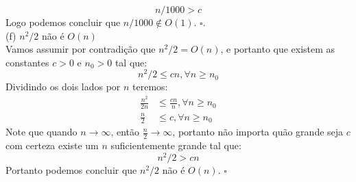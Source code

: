 \[ n/1000 > c\]
Logo podemos concluir que $n/1000 \not \in O(1)$. $\square$.
\\[6pt]
(f) $n^2/2$ não é $O(n)$
\\[6pt]
Vamos assumir por contradição que $n^2/2 = O(n)$, e portanto que existem as constantes $c > 0$ e $n_0 > 0$ tal que:
\[ n^2/2 \leq  cn, \forall n \geq n_0 \]
Dividindo os dois lados por $n$ teremos:
\begin{align*}
  \frac{n^2}{2n} &\leq \frac{cn}{n}, \forall n \geq n_0 \\
  \frac{n}{2} &\leq c, \forall n \geq n_0
\end{align*}
Note que quando $n \rightarrow \infty$, então $\frac{n}{2} \rightarrow \infty$, portanto não importa quão grande seja $c$ com certeza existe um $n$ suficientemente grande tal que:
\[ n^2/2 > cn \]
Portanto podemos concluir que $n^2/2$ não é $O(n)$. $\square$




